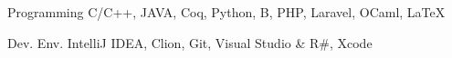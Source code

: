 

\begin{cvskills}

  \cvskill
    {Programming} %
    {C/C++, JAVA, Coq, Python, B, PHP, Laravel, OCaml, \LaTeX} %

  \cvskill
    {Dev. Env.} %
    {IntelliJ IDEA, Clion, Git, Visual Studio \& R\#, Xcode} %

\end{cvskills}
